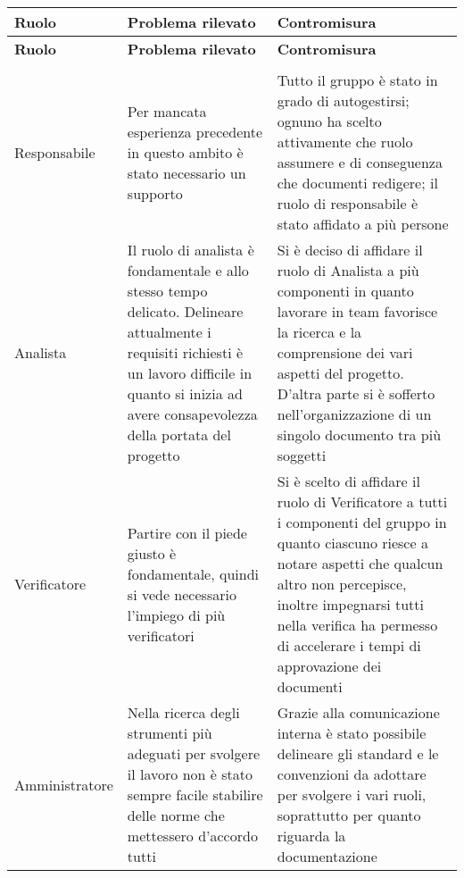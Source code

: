 \documentclass[../piano_di_qualifica.tex]{subfiles}
\begin{document}
\begin{center}
	\begin{longtable}{|p{2.5cm}|p{7cm}|p{7cm}|}
		\hline
		\rowcolor{lightgray}
		{\textbf{Ruolo}} & {\textbf{Problema rilevato}} & {\textbf{Contromisura}} \\
		\hline
		\endfirsthead
		\hline
		\rowcolor{lightgray}
		{\textbf{Ruolo}} & {\textbf{Problema rilevato}} & {\textbf{Contromisura}} \\
		\hline
		\endhead

		\hline
		\rowcolor{white}
		\multicolumn{3}{|c|}{\emph{Continua alla pagina successiva...}} \\
		\hline
		\endfoot
		\endlastfoot

		Responsabile   & Per mancata esperienza precedente in questo ambito è stato necessario un supporto                                                                                                                          & Tutto il gruppo è stato in grado di autogestirsi; ognuno ha scelto attivamente che ruolo assumere e di conseguenza che documenti redigere; il ruolo di responsabile è stato affidato a più persone                                                                    \\
		Analista       & Il ruolo di analista è fondamentale e allo stesso tempo delicato. Delineare attualmente i requisiti richiesti è un lavoro difficile in quanto si inizia ad avere consapevolezza della portata del progetto & Si è deciso di affidare il ruolo di Analista a più componenti in quanto lavorare in team favorisce la ricerca e la comprensione dei vari aspetti del progetto. D'altra parte si è sofferto nell'organizzazione di un singolo documento tra più soggetti               \\
		Verificatore   & Partire con il piede giusto è fondamentale, quindi si vede necessario l'impiego di più verificatori                                                                                                        & Si è scelto di affidare il ruolo di Verificatore a tutti i componenti del gruppo in quanto ciascuno riesce a notare aspetti che qualcun altro non percepisce, inoltre impegnarsi tutti nella verifica ha permesso di accelerare i tempi di approvazione dei documenti \\
		Amministratore & Nella ricerca degli strumenti più adeguati per svolgere il lavoro non è stato sempre facile stabilire delle norme che mettessero d'accordo tutti                                                           & Grazie alla comunicazione interna è stato possibile delineare gli standard e le convenzioni da adottare per svolgere i vari ruoli, soprattutto per quanto riguarda la documentazione                                                                                  \\

\end{longtable}
\end{center}
\end{document}
